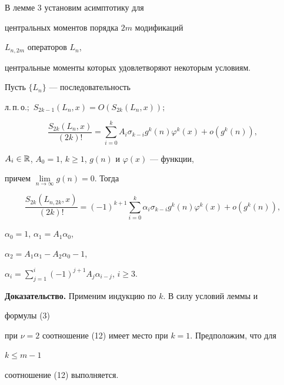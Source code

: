  


 


В лемме 3 установим асимптотику для 


центральных моментов порядка $2m$ модификаций 


$L_{n,2m}$ операторов $L_n$, 


центральные моменты которых удовлетворяют некоторым условиям. 


 


\begin{lem} 


Пусть $\{L_n\}$ --- последовательность 


л.\,п.\,о.$;$ $S_{2k-1}(L_n,x)=O(S_{2k}(L_n,x));$ 


\begin{equation} 


\frac{S_{2k}(L_n,x)}{(2k)!}=\sum^k_{i=0} 


A_i\sigma_{k-i}g^k(n)\varphi^k(x)+o(g^k(n)), 


\end{equation} 


$A_i\in\Bbb R$, $A_0=1$, $k\ge1$, $g(n)$ и $\varphi(x)$ --- функции, 


причем $\lim\limits_{n\to\infty}g(n)=0$. Тогда 


\begin{equation} 


\frac{S_{2k}(L_{n,2k},x)}{(2k)!}=(-1)^{k+1}\sum^k_{i=0} 


\alpha_i\sigma_{k-i}g^k(n)\varphi^k(x)+o(g^k(n)), 


\end{equation} 


$\alpha_0=1$, $\alpha_1=A_1\alpha_0$, 


$\alpha_2=A_1\alpha_1-A_2\alpha_0-1$, 


$\alpha_i=\sum\limits^i_{j=1}(-1)^{j+1}A_j\alpha_{i-j}$, $i\ge3$. 


\end{lem} 


 


 


{\bf Доказательство.} Применим индукцию по $k$. В силу условий леммы и 


формулы (3) 


при $\nu=2$ соотношение (12)  имеет место при $k=1$. Предположим, что для 


$k\le m-1$ 


соотношение (12) выполняется. 


